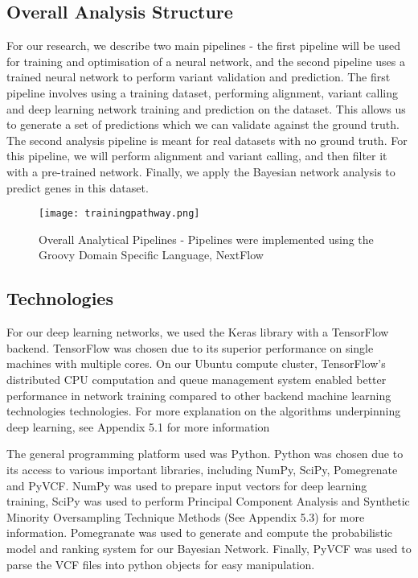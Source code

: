\documentclass{article}
\begin{document}
\subsection{Overall Analysis Structure}
For our research, we describe two main pipelines - the first pipeline will be used for training and optimisation of a neural network, and the second pipeline uses a trained neural network to perform variant validation and prediction. The first pipeline involves using a training  dataset, performing alignment, variant calling and deep learning network training and prediction on the dataset. This allows us to generate a set of predictions which we can validate against the ground truth. The second analysis pipeline is meant for real datasets with no ground truth. For this pipeline, we will perform alignment and variant calling, and then filter it with a pre-trained network. Finally, we apply the Bayesian network analysis to predict genes in this dataset.

\begin{figure}[H]
\texttt{[image: trainingpathway.png]}
\centering
\caption{Overall Analytical Pipelines - Pipelines were implemented using the Groovy Domain Specific Language, NextFlow}
\end{figure}


\subsection{Technologies}
For our deep learning networks, we used the Keras library with a TensorFlow backend. TensorFlow was chosen due to its superior performance on single machines with multiple cores. On our Ubuntu compute cluster, TensorFlow's distributed CPU computation and queue management system enabled better performance in network training compared to other backend machine learning technologies technologies. For more explanation on the algorithms underpinning deep learning, see Appendix 5.1 for more information 

The general programming platform used was Python. Python was chosen due to its access to various important libraries, including NumPy, SciPy, Pomegrenate and PyVCF. NumPy was used to prepare input vectors for deep learning training, SciPy was used to perform Principal Component Analysis and Synthetic Minority Oversampling Technique Methods (See Appendix 5.3) for more information. Pomegranate was used to generate and compute the probabilistic model and ranking system for our Bayesian Network. Finally, PyVCF was used to parse the VCF files into python objects for easy manipulation.
\end{document}

